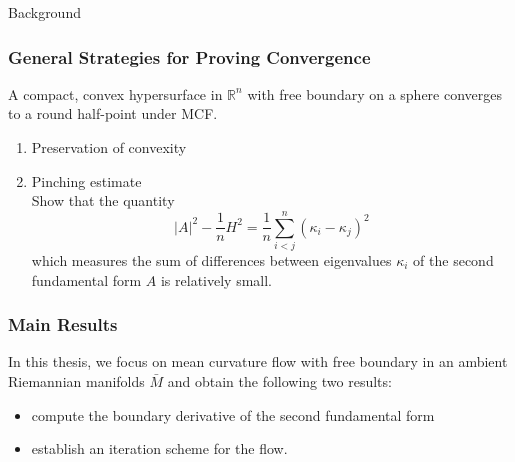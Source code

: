\documentclass[pdf]{beamer}
\newcommand{\R}{\mathbb{R}}
\begin{document}
\begin{section}{Background}
\begin{frame}
    \end{frame}

    \begin{frame}
        \frametitle{General Strategies for Proving Convergence}
        \begin{theorem}
            A compact, convex hypersurface in $\R^n$ with free boundary on a sphere converges to a round half-point under MCF.
        \end{theorem}
        \begin{enumerate}
            \item Preservation of convexity
            \item Pinching estimate\\
            Show that the quantity
            \[\left| A \right| ^2-\frac{1}{n}H^2=\frac{1}{n}\sum_{i<j}^{n}(\kappa _i-\kappa _j)^2\]
            which measures the sum of differences between eigenvalues $\kappa _i$ of the second fundamental form $A$ is relatively small.
        \end{enumerate}
        
    \end{frame}

    \begin{frame}
        \frametitle{Main Results}
        In this thesis, we focus on mean curvature flow with free boundary in an ambient Riemannian manifolds $\bar{M}$ and obtain the following two results:
        \begin{itemize}
            \item compute the boundary derivative of the second fundamental form
            \item establish an iteration scheme for the flow.
        \end{itemize}
    \end{frame}


\end{section}
\end{document}
